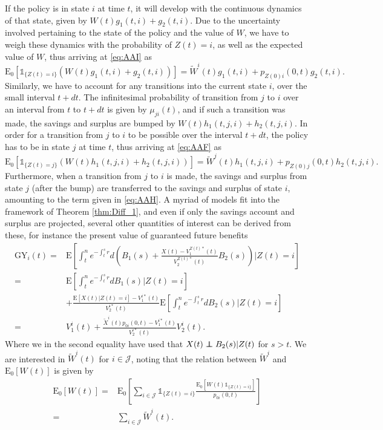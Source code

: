 \documentclass[12pt]{article}
\newcommand{\E}{\text{E}}
\newcommand{\indic}[1]{\mathds{1}_{ \{ #1 \} }}
\newcommand\independent{\protect\mathpalette{\protect\independenT}{\perp}}
\def\independenT#1#2{\mathrel{\rlap{$#1#2$}\mkern2mu{#1#2}}}
\theoremstyle{my_thm}
\begin{document}
If the policy is in state $i$ at time $t$, it will develop with the continuous dynamics of that state, given by $W(t)g_1(t,i)+g_2(t,i)$. Due to the uncertainty involved pertaining to the state of the policy and the value of $W$, we have to weigh these dynamics with the probability of $Z(t)=i$, as well as the expected value of $W$, thus arriving at \eqref{eq:AAI} as
$$
\E_0 [\indic{Z(t)=i} \left(W(t)g_1(t,i)+g_2(t,i)\right)]= \tilde{W}^i(t)g_1(t,i)+p_{Z(0)i}(0,t)g_2(t,i).
$$
Similarly, we have to account for any transitions into the current state $i$, over the small interval $t+dt$. The infinitesimal probability of transition from $j$ to $i$ over an interval from $t$ to $t+dt$ is given by $\mu_{ji}(t)$, and if such a transition was made, the savings and surplus are bumped by $W(t)h_1(t,j,i)+h_2(t,j,i)$. In order for a transition from $j$ to $i$ to be possible over the interval $t+dt$, the policy has to be in state $j$ at time $t$, thus arriving at 
\eqref{eq:AAF} as
$$
\E_0[ \indic{Z(t)=j} \left( W(t)h_1(t,j,i)+ h_2(t,j,i)\right)]=\tilde{W}^j(t) h_1(t,j,i)+ p_{Z(0)j}(0,t)h_2(t,j,i).
$$
Furthermore, when a transition from $j$ to $i$ is made, the savings and surplus from state $j$ (after the bump) are transferred to the savings and surplus of state $i$, amounting to the term given in \eqref{eq:AAH}. A myriad of models fit into the framework of Theorem \ref{thm:Diff_1}, and even if only the savings account and surplus are projected, several other quantities of interest can be derived from these, for instance the present value of guaranteed future benefits
\begin{align*}
\text{GY}_i(t)=&\E \left[ \int_t^n e^{-\int_t^s r} d \left( B_1(s)+\frac{X(t)-V_1^{Z(t)*}(t)}{V_2^{Z(t)*}(t)}B_2(s) \right) \big|Z(t)=i\right]
\\
=&
\E \left[ \int_t^n e^{-\int_t^s r} d B_1(s) \big| Z(t)=i \right]
\\
&+ \frac{\E[X(t)|Z(t)=i]-V_1^{i*}(t)}{V_2^{i*}(t)}  \E \left[ \int_t^n e^{-\int_t^s r} dB_2(s) \big|Z(t)=i\right]
\\
=&
V_1^i(t)+\frac{\tilde{X}^{i}(t)p_{0i}(0,t)-V_1^{i*}(t)}{V_2^{i*}(t)}V_2^i(t).
\end{align*}
Where we in the second equality have used that $X(t)\independent B_2(s)|Z(t)$ for $s>t$.
We are interested in $\tilde{W}^i(t)$ for $i \in \mathcal{J}$, noting that the relation between $\tilde{W}^i$ and $\E_0[W(t)]$ is given by
\begin{align*}
\E_0[W(t)] =&
\E_0 \left[ \sum_{i\in \mathcal{J}} \indic{Z(t)=i} \frac{\E_0[W(t)\indic{Z(t)=i}]}{p_{0i}(0,t)} \right]
\\
=&
\sum_{i\in \mathcal{J}} \tilde{W}^i(t).
\end{align*}
\end{document}
